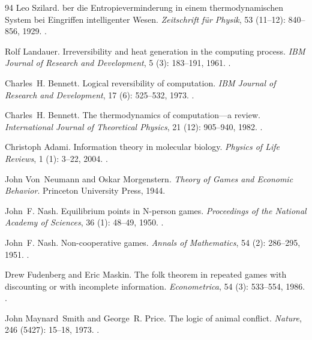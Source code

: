 \documentclass[11pt]{article}
\theoremstyle{plain}
\theoremstyle{definition}
\theoremstyle{remark}
\begin{document}
\begin{thebibliography}{94}
Leo Szilard.
ber die {Entropieverminderung} in einem thermodynamischen
  {System} bei {Eingriffen} intelligenter {Wesen}.
\newblock \emph{Zeitschrift f{\"u}r Physik}, 53 (11--12):
  840--856, 1929.
\newblock {}.

Rolf Landauer.
\newblock Irreversibility and heat generation in the computing process.
\newblock \emph{IBM Journal of Research and Development}, 5
  (3): 183--191, 1961.
\newblock {}.

Charles~H. Bennett.
\newblock Logical reversibility of computation.
\newblock \emph{IBM Journal of Research and Development}, 17
  (6): 525--532, 1973.
\newblock {}.

Charles~H. Bennett.
\newblock The thermodynamics of computation---a review.
\newblock \emph{International Journal of Theoretical Physics}, 21
  (12): 905--940, 1982.
\newblock {}.

Christoph Adami.
\newblock Information theory in molecular biology.
\newblock \emph{Physics of Life Reviews}, 1 (1): 3--22, 2004.
\newblock {}.

John Von~Neumann and Oskar Morgenstern.
\newblock \emph{Theory of Games and Economic Behavior}.
\newblock Princeton University Press, 1944.

John~F. Nash.
\newblock Equilibrium points in {N}-person games.
\newblock \emph{Proceedings of the National Academy of Sciences}, 36
  (1): 48--49, 1950.
\newblock {}.

John~F. Nash.
\newblock Non-cooperative games.
\newblock \emph{Annals of Mathematics}, 54 (2): 286--295,
  1951.
\newblock {}.

Drew Fudenberg and Eric Maskin.
\newblock The folk theorem in repeated games with discounting or with
  incomplete information.
\newblock \emph{Econometrica}, 54 (3): 533--554, 1986.
\newblock {}.

John Maynard~Smith and George~R. Price.
\newblock The logic of animal conflict.
\newblock \emph{Nature}, 246 (5427): 15--18, 1973.
\newblock {}.


\end{thebibliography}
\end{document}

